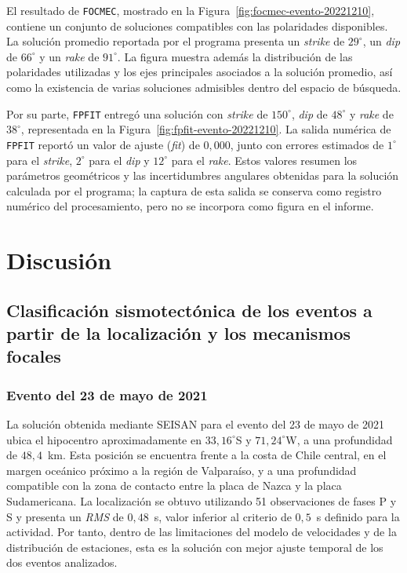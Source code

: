 \documentclass[a4paper,12pt]{article} %
\numberwithin{equation}{section} %
\numberwithin{figure}{section} %
\begin{document}
El resultado de \texttt{FOCMEC}, mostrado en la Figura~\ref{fig:focmec-evento-20221210}, contiene un conjunto de soluciones compatibles con las polaridades disponibles. La solución promedio reportada por el programa presenta un \textit{strike} de $29^\circ$, un \textit{dip} de $66^\circ$ y un \textit{rake} de $91^\circ$. La figura muestra además la distribución de las polaridades utilizadas y los ejes principales asociados a la solución promedio, así como la existencia de varias soluciones admisibles dentro del espacio de búsqueda.

Por su parte, \texttt{FPFIT} entregó una solución con \textit{strike} de $150^\circ$, \textit{dip} de $48^\circ$ y \textit{rake} de $38^\circ$, representada en la Figura~\ref{fig:fpfit-evento-20221210}. La salida numérica de \texttt{FPFIT} reportó un valor de ajuste (\textit{fit}) de $0{,}000$, junto con errores estimados de $1^\circ$ para el \textit{strike}, $2^\circ$ para el \textit{dip} y $12^\circ$ para el \textit{rake}. Estos valores resumen los parámetros geométricos y las incertidumbres angulares obtenidas para la solución calculada por el programa; la captura de esta salida se conserva como registro numérico del procesamiento, pero no se incorpora como figura en el informe.


\newpage

\section{Discusión}

\subsection{Clasificación sismotectónica de los eventos a partir de la localización y los mecanismos focales}

\subsubsection{Evento del 23 de mayo de 2021}

La solución obtenida mediante SEISAN para el evento del 23 de mayo de 2021 ubica el hipocentro aproximadamente en $33{,}16^\circ$S y $71{,}24^\circ$W, a una profundidad de $48{,}4$~km. Esta posición se encuentra frente a la costa de Chile central, en el margen oceánico próximo a la región de Valparaíso, y a una profundidad compatible con la zona de contacto entre la placa de Nazca y la placa Sudamericana. La localización se obtuvo utilizando 51 observaciones de fases P y S y presenta un \textit{RMS} de $0{,}48$~s, valor inferior al criterio de $0{,}5$~s definido para la actividad. Por tanto, dentro de las limitaciones del modelo de velocidades y de la distribución de estaciones, esta es la solución con mejor ajuste temporal de los dos eventos analizados.
\end{document}
